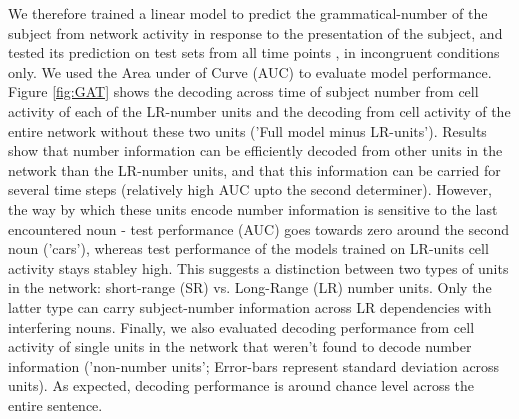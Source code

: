We therefore trained a linear model to predict the grammatical-number of the subject from network activity in response to the presentation of the subject, and tested its prediction on test sets from all time points , in incongruent conditions only. We used the Area under of Curve (AUC) to evaluate model performance. Figure \ref{fig:GAT} shows the decoding across time of subject number from cell activity of each of the LR-number units and the decoding from cell activity of the entire network without these two units ('Full model minus LR-units'). Results show that number information can be efficiently decoded from other units in the network than the LR-number units, and that this information can be carried for several time steps (relatively high AUC upto the second determiner). However, the way by which these units encode number information is sensitive to the last encountered noun - test performance (AUC) goes towards zero around the second noun ('cars'), whereas test performance of the models trained on LR-units cell activity stays stabley high. This suggests a distinction between two types of units in the network: short-range (SR) vs. Long-Range (LR) number units. Only the latter type can carry subject-number information across LR dependencies with interfering nouns. Finally, we also evaluated decoding performance from cell activity of single units in the network that weren't found to decode number information ('non-number units'; Error-bars represent standard deviation across units). As expected, decoding performance is around chance level across the entire sentence. 



